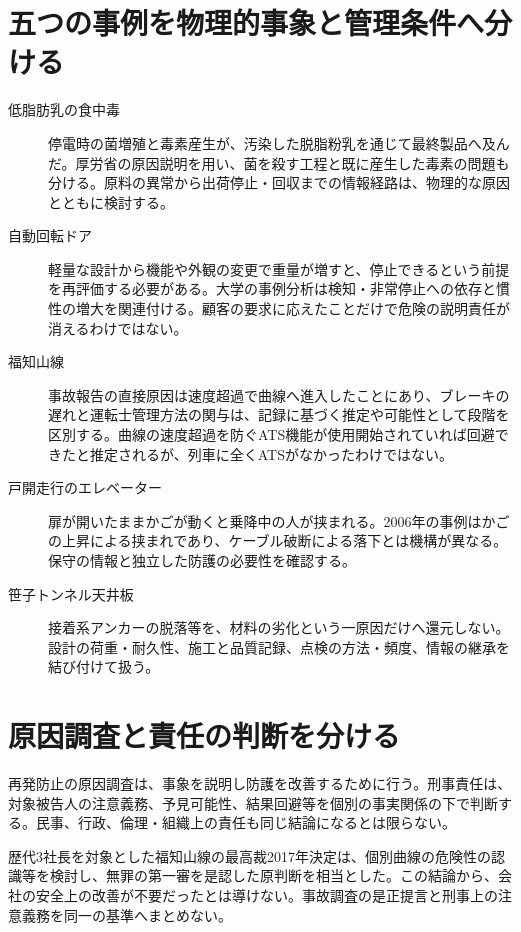 \section{五つの事例を物理的事象と管理条件へ分ける}
\label{theory:safety:cases}
\begin{description}
 \item[低脂肪乳の食中毒] 停電時の菌増殖と毒素産生が、汚染した脱脂粉乳を通じて最終製品へ及んだ。厚労省の原因説明を用い、菌を殺す工程と既に産生した毒素の問題も分ける\parencite{mhlw_milk2002}。原料の異常から出荷停止・回収までの情報経路は、物理的な原因とともに検討する。
 \item[自動回転ドア] 軽量な設計から機能や外観の変更で重量が増すと、停止できるという前提を再評価する必要がある。大学の事例分析は検知・非常停止への依存と慣性の増大を関連付ける\parencite{muroran_ethics_cases}。顧客の要求に応えたことだけで危険の説明責任が消えるわけではない。
 \item[福知山線] 事故報告の直接原因は速度超過で曲線へ進入したことにあり、ブレーキの遅れと運転士管理方法の関与は、記録に基づく推定や可能性として段階を区別する。曲線の速度超過を防ぐATS機能が使用開始されていれば回避できたと推定されるが、列車に全くATSがなかったわけではない\parencite{jtsb_fukuchiyama2007}。
 \item[戸開走行のエレベーター] 扉が開いたままかごが動くと乗降中の人が挟まれる。2006年の事例はかごの上昇による挟まれであり、ケーブル破断による落下とは機構が異なる。保守の情報と独立した防護の必要性を確認する\parencite{caa_elevator2006}。
 \item[笹子トンネル天井板] 接着系アンカーの脱落等を、材料の劣化という一原因だけへ還元しない。設計の荷重・耐久性、施工と品質記録、点検の方法・頻度、情報の継承を結び付けて扱う\parencite{mlit_sasago2013}。
\end{description}

\section{原因調査と責任の判断を分ける}
\label{theory:safety:responsibility}
再発防止の原因調査は、事象を説明し防護を改善するために行う。刑事責任は、対象被告人の注意義務、予見可能性、結果回避等を個別の事実関係の下で判断する。民事、行政、倫理・組織上の責任も同じ結論になるとは限らない。

歴代3社長を対象とした福知山線の最高裁2017年決定は、個別曲線の危険性の認識等を検討し、無罪の第一審を是認した原判断を相当とした\parencite{court_jr2017}。この結論から、会社の安全上の改善が不要だったとは導けない。事故調査の是正提言と刑事上の注意義務を同一の基準へまとめない。

